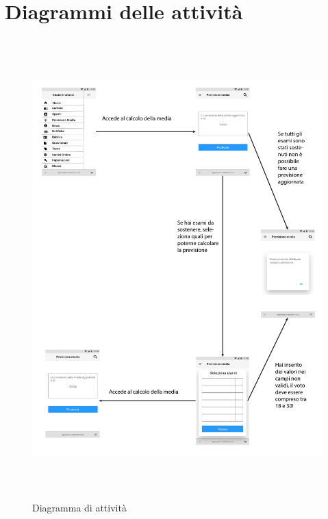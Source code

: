 \section{Diagrammi delle attività}

\begin{figure}[H]
	\centering
	\includegraphics[height=7in]{imgs/gruppo3/media-activity-diagram.pdf}
	\caption{Diagramma di attività}
	\label{fig:prova}
\end{figure}
